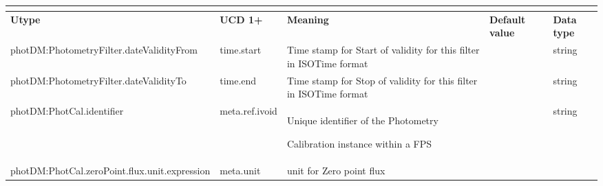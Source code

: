 \documentclass[11pt,a4paper]{ivoa}
\begin{document}
\begin{appendices}
\begin{table}[H]
\centering
\begin{adjustbox}{angle=90}
\begin{tabular}{p{3in}p{0.87in}p{2in}p{1in}p{0.25in}}
\multicolumn{5}{p{\dimexpr6.59in+8\tabcolsep\relax}}{\centering {\fontsize{10pt}{12.0pt}\selectfont \textbf{PhotCal Metadata}}} \\
\hline
\multicolumn{1}{p{3in}}{{\fontsize{8pt}{8pt}\selectfont \textbf{Utype}}} &
\multicolumn{1}{p{0.87in}}{{\fontsize{8pt}{8pt}\selectfont \textbf{UCD 1+}}} &
\multicolumn{1}{p{2in}}{{\fontsize{8pt}{8pt}\selectfont \textbf{Meaning}}} &
\multicolumn{1}{p{1in}}{{\fontsize{8pt}{8pt}\selectfont \textbf{Default value}}} &
\multicolumn{1}{p{0.25in}}{{\fontsize{8pt}{8pt}\selectfont \textbf{Data type}}} \\
\hline
\multicolumn{1}{p{3in}}{{\fontsize{8pt}{8pt}\selectfont photDM:PhotometryFilter.dateValidityFrom}} &
\multicolumn{1}{p{0.87in}}{{\fontsize{8pt}{8pt}\selectfont time.start}} &
\multicolumn{1}{p{2in}}{{\fontsize{8pt}{8pt}\selectfont Time stamp for Start of validity for this filter in ISOTime format }} &
\multicolumn{1}{p{1in}}{} &
\multicolumn{1}{p{0.25in}}{{\fontsize{8pt}{8pt}\selectfont string }} \\
\hline
\multicolumn{1}{p{3in}}{{\fontsize{8pt}{8pt}\selectfont photDM:PhotometryFilter.dateValidityTo}} &
\multicolumn{1}{p{0.87in}}{{\fontsize{8pt}{8pt}\selectfont time.end}} &
\multicolumn{1}{p{2in}}{{\fontsize{8pt}{8pt}\selectfont Time stamp for Stop of validity for this filter in ISOTime format }} &
\multicolumn{1}{p{1in}}{} &
\multicolumn{1}{p{0.25in}}{{\fontsize{8pt}{8pt}\selectfont string }} \\
\hline
\multicolumn{1}{p{3in}}{{\fontsize{8pt}{8pt}\selectfont photDM:PhotCal.identifier}} &
\multicolumn{1}{p{0.87in}}{{\fontsize{8pt}{8pt}\selectfont meta.ref.ivoid }} &
\multicolumn{1}{p{2in}}{{\fontsize{8pt}{8pt}\selectfont Unique identifier of the Photometry } \par {\fontsize{8pt}{8pt}\selectfont Calibration instance within a FPS}} &
\multicolumn{1}{p{1in}}{} &
\multicolumn{1}{p{0.25in}}{{\fontsize{8pt}{8pt}\selectfont string}} \\
\hline
\multicolumn{1}{p{3in}}{{\fontsize{8pt}{8pt}\selectfont photDM:PhotCal.zeroPoint.flux.unit.expression}} &
\multicolumn{1}{p{0.87in}}{{\fontsize{8pt}{8pt}\selectfont meta.unit }} &
\multicolumn{1}{p{2in}}{{\fontsize{8pt}{8pt}\selectfont unit for Zero point flux}} &

\end{tabular}
\end{adjustbox}
\end{table}
\end{appendices}
\end{document}
